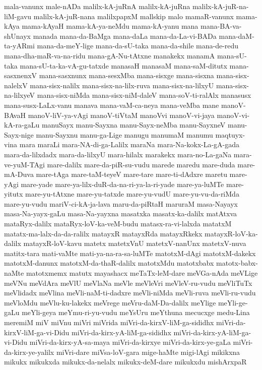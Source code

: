 {mala-vanunx
male-nADa
malilx-kA-juRnA
malilx-kA-juRna
malilx-kA-juR-na-liM-gavu
malilx-kA-juR-nana
malilxpapxM
mallskip
malo
mamaR-vanunx
mama-kAya
mama-kAyaH
mama-kA-ya-neMdu
mama-kA-yanu
mana
mana-BA-va-shUnayx
manada
mana-da-BaMga
mana-daLa
mana-da-La-vi-BADa
mana-daM-ta-yARmi
mana-da-meY-lige
mana-da-sU-taka
mana-da-shile
mana-de-redu
mana-dha-maR-va-na-ridu
mana-gA-Nu-tAtxne
manakekx
manamA
mana-sU-taka
mana-sU-ta-ka-vA-gu-tatxde
manasaH
manasaM
mana-saM-ditutx
mana-sasxnenxV
mana-sasxnunx
mana-sesxMba
mana-sisxge
mana-sisxna
mana-sisx-nalelxV
mana-sisx-nalilx
mana-sisx-na-lilx-ruva
mana-sisx-na-lilxyU
mana-sisx-na-lilxyeV
mana-sisx-niMda
mana-sisx-niM-daleV
mana-soV-ti-ralAlx
manasusx
mana-susx-LaLx-vanu
manava
mana-vaM-ca-neya
mana-veMba
mane
manoV-BAvaH
manoV-liV-ya-vAgi
manoV-tiVtaM
manoVvi
manoV-vi-jaya
manoV-vi-kA-ra-gaLu
manuSayx
manu-Sayxna
manu-Sayx-neMba
manu-SayxneV
manu-Sayx-nige
manu-Sayxnu
manu-ga-Lige
manugu
manumaM
manumu
maqtuyx-vina
mara
maraLi
mara-NA-di-ga-Lalilx
maraNa
mara-Na-kokx-La-gA-gada
mara-da-lilxdadx
mara-da-lilxyU
mara-hilalx
marakekx
mara-no-La-gaNa
mara-ve-yuM-TAgi
mare-dalilx
mare-da-piR-su-vudu
marede
maredu
mare-duda
mare-mA-Duva
mare-tAga
mare-taM-teyeV
mare-tare
mare-ti-dAdxre
maretu
mare-yAgi
mare-yade
mare-ya-lilx-duR-da-na-ri-ya-la-ri-yade
mare-ya-luMTe
mare-yitutx
mare-yu-tAtxne
mare-yu-tatxde
mare-yu-vudU
mare-yu-vu-da-riMda
mare-yu-vudu
mariV-ci-kA-ja-lava
maru-da-piRtaH
maruraM
masa-Nayayx
masa-Na-yayx-gaLu
masa-Na-yayxna
masatxka
masatx-ka-dalilx
matAtxva
mataRyx-dalilx
mataRyx-loV-ka-veM-budu
matasx-ra-vi-lalxda
matatxM
matatx-ma-lalx-da-da-ralilx
matayxR
matayxRda
matayxRkekx
matayxR-loV-ka-dalilx
matayxR-loV-kavu
matetx
matetxVnU
matetxV-nanUnx
matetxV-nuva
matitx-tara
mati-vaMte
mati-ya-na-ra-sa-luMTe
matotxM-dAgi
matotxM-dakekx
matotxM-danunx
matotxM-da-thaR-dalilx
matotxMdu
matotxbabx
matotx-babx-naMte
matotxmemx
matutx
mayashacx
meTaTx-leM-dare
meVGa-nAda
meVLige
meVNu
meVdAra
meVlU
meVlaNa
meVle
meVleVri
meVleV-ru-vudu
meVliTuTx
meVlidadx
meVlina
meVli-naM-ti-dadxre
meVli-niMda
meVli-ruva
meVli-ru-vudu
meVloMdu
meVlu-ku-lakekx
meVrege
meVru-daM-Da-dalilx
meYlige
meYli-ge-gaLu
meYli-geya
meYmu-ri-yu-vudu
meYsUru
meYthuna
mecucxge
medu-Lina
meremiM
miV
miVnu
miVri
miVrida
miVri-da-kirxV-liM-ga-sididhx
miVri-da-kirxV-liM-ga-vi-Didu
miVri-da-kirx-yA-liM-ga-sididhx
miVri-da-kirx-yA-liM-ga-vi-Didu
miVri-da-kirx-yA-sa-maya
miVri-da-kirxye
miVri-da-kirx-ye-gaLa
miVri-da-kirx-ye-yalilx
miVri-dare
miVsa-loV-gara
mige-haMte
migi-lAgi
mikikxna
mikukx
mikukxda
mikukx-da-nelalx
mikukx-deM-dare
mikukxdu
mishArxpaR
}
